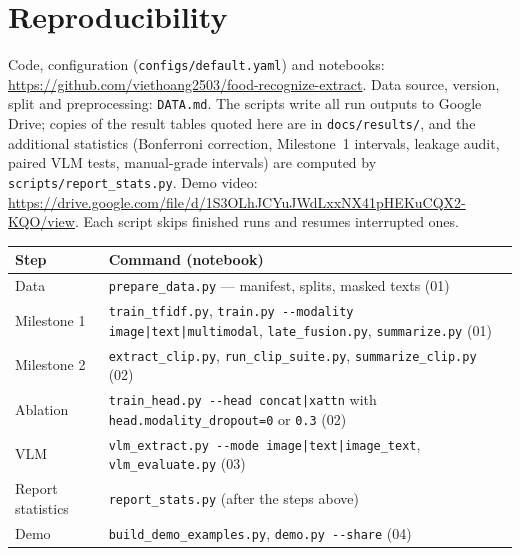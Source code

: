 \documentclass[11pt,a4paper]{article}
\begin{document}
\section{Reproducibility}

Code, configuration (\texttt{configs/default.yaml}) and notebooks:
\url{https://github.com/viethoang2503/food-recognize-extract}. Data source, version, split and preprocessing:
\texttt{DATA.md}. The scripts write all run outputs to Google Drive; copies of the result tables quoted here are in
\texttt{docs/results/}, and the additional statistics (Bonferroni correction, Milestone~1 intervals, leakage audit,
paired VLM tests, manual-grade intervals) are computed by \texttt{scripts/report\_stats.py}. Demo video: \url{https://drive.google.com/file/d/1S3OLhJCYuJWdLxxNX41pHEKuCQX2-KQO/view}.
Each script skips finished runs and resumes interrupted ones.

\begin{center}
\small
\begin{tabularx}{\linewidth}{lX}
\toprule
Step & Command (notebook) \\
\midrule
Data & \texttt{prepare\_data.py} --- manifest, splits, masked texts (01) \\
Milestone 1 & \texttt{train\_tfidf.py}, \texttt{train.py -{}-modality image|text|multimodal}, \texttt{late\_fusion.py}, \texttt{summarize.py} (01) \\
Milestone 2 & \texttt{extract\_clip.py}, \texttt{run\_clip\_suite.py}, \texttt{summarize\_clip.py} (02) \\
Ablation & \texttt{train\_head.py -{}-head concat|xattn} with \texttt{head.modality\_dropout=0} or \texttt{0.3} (02) \\
VLM & \texttt{vlm\_extract.py -{}-mode image|text|image\_text}, \texttt{vlm\_evaluate.py} (03) \\
Report statistics & \texttt{report\_stats.py} (after the steps above) \\
Demo & \texttt{build\_demo\_examples.py}, \texttt{demo.py -{}-share} (04) \\
\bottomrule
\end{tabularx}
\end{center}
\end{document}
